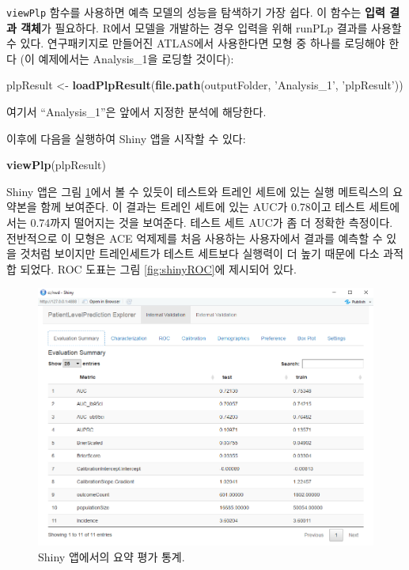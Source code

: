 \documentclass[11pt]{book}
\newenvironment{Shaded}{\begin{snugshade}}{\end{snugshade}}
\newcommand{\KeywordTok}[1]{\textcolor[rgb]{0.13,0.29,0.53}{\textbf{#1}}}
\newcommand{\StringTok}[1]{\textcolor[rgb]{0.31,0.60,0.02}{#1}}
\newcommand{\NormalTok}[1]{#1}
\theoremstyle{definition}
\theoremstyle{definition}
\theoremstyle{definition}
\theoremstyle{remark}
\begin{document}
\texttt{viewPlp} 함수를 사용하면 예측 모델의 성능을 탐색하기 가장 쉽다.
이 함수는 \textbf{입력 결과 객체}가 필요하다. R에서 모델을 개발하는 경우
입력을 위해 runPLp 결과를 사용할 수 있다. 연구패키지로 만들어진
ATLAS에서 사용한다면 모형 중 하나를 로딩해야 한다 (이 예제에서는
Analysis\_1을 로딩할 것이다): 

\begin{Shaded}
\begin{Highlighting}[]
\NormalTok{plpResult <-}\StringTok{ }\KeywordTok{loadPlpResult}\NormalTok{(}\KeywordTok{file.path}\NormalTok{(outputFolder, }
                                     \StringTok{'Analysis_1'}\NormalTok{, }
                                     \StringTok{'plpResult'}\NormalTok{))}
\end{Highlighting}
\end{Shaded}

여기서 ``Analysis\_1''은 앞에서 지정한 분석에 해당한다.

이후에 다음을 실행하여 Shiny 앱을 시작할 수 있다:

\begin{Shaded}
\begin{Highlighting}[]
\KeywordTok{viewPlp}\NormalTok{(plpResult)}
\end{Highlighting}
\end{Shaded}

Shiny 앱은 그림 \ref{fig:shinySummary}에서 볼 수 있듯이 테스트와 트레인
세트에 있는 실행 메트릭스의 요약본을 함께 보여준다. 이 결과는 트레인
세트에 있는 AUC가 0.78이고 테스트 세트에서는 0.74까지 떨어지는 것을
보여준다. 테스트 세트 AUC가 좀 더 정확한 측정이다. 전반적으로 이 모형은
ACE 억제제를 처음 사용하는 사용자에서 결과를 예측할 수 있을 것처럼
보이지만 트레인세트가 테스트 세트보다 실행력이 더 높기 때문에 다소
과적합 되었다. ROC 도표는 그림 \ref{fig:shinyROC}에 제시되어 있다.

\begin{figure}
\includegraphics[width=1\linewidth]{images/PatientLevelPrediction/shinysummary} \caption{Shiny 앱에서의 요약 평가 통계.}\label{fig:shinySummary}
\end{figure}
\end{document}
